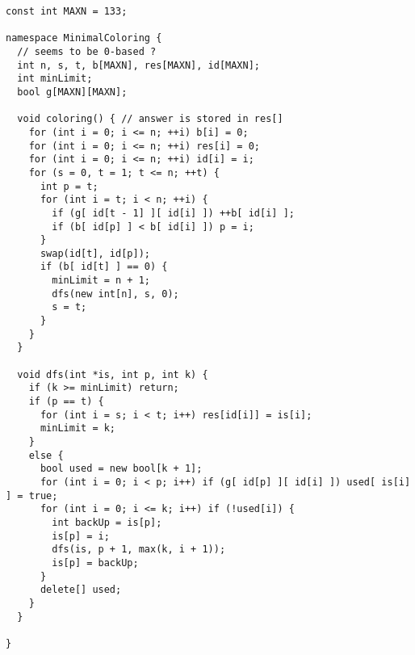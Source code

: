 \begin{lstlisting}
const int MAXN = 133;

namespace MinimalColoring {
  // seems to be 0-based ?
  int n, s, t, b[MAXN], res[MAXN], id[MAXN];
  int minLimit;
  bool g[MAXN][MAXN];

  void coloring() { // answer is stored in res[]
    for (int i = 0; i <= n; ++i) b[i] = 0;
    for (int i = 0; i <= n; ++i) res[i] = 0;
    for (int i = 0; i <= n; ++i) id[i] = i;
    for (s = 0, t = 1; t <= n; ++t) {
      int p = t;
      for (int i = t; i < n; ++i) {
        if (g[ id[t - 1] ][ id[i] ]) ++b[ id[i] ];
        if (b[ id[p] ] < b[ id[i] ]) p = i;
      }
      swap(id[t], id[p]);
      if (b[ id[t] ] == 0) {
        minLimit = n + 1;
        dfs(new int[n], s, 0);
        s = t;
      }
    }
  }

  void dfs(int *is, int p, int k) {
    if (k >= minLimit) return;
    if (p == t) {
      for (int i = s; i < t; i++) res[id[i]] = is[i];
      minLimit = k;
    }
    else {
      bool used = new bool[k + 1];
      for (int i = 0; i < p; i++) if (g[ id[p] ][ id[i] ]) used[ is[i] ] = true;
      for (int i = 0; i <= k; i++) if (!used[i]) {
        int backUp = is[p];
        is[p] = i;
        dfs(is, p + 1, max(k, i + 1));
        is[p] = backUp;
      }
      delete[] used;
    }
  }

}

\end{lstlisting}